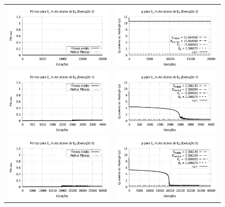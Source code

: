 \begin{figure}[htbp]
\begin{tabular}{@{}cc@{}}
		\includegraphics[width=.49\textwidth]{figs/resultados/variandoEL/T4E3_fitness-extendido.pdf} &
    \includegraphics[width=.49\textwidth]{figs/resultados/variandoEL/T4E3_rho_extendido.pdf}   \\
		
		\includegraphics[width=.49\textwidth]{figs/resultados/variandoEL/T4E4_fitness-extendido.pdf} &
    \includegraphics[width=.49\textwidth]{figs/resultados/variandoEL/T4E4_rho_extendido.pdf}   \\
		
		\includegraphics[width=.49\textwidth]{figs/resultados/variandoEL/T4E5_fitness-extendido.pdf} &
    \includegraphics[width=.49\textwidth]{figs/resultados/variandoEL/T4E5_rho_extendido.pdf}
		

\end{tabular}
\end{figure}
